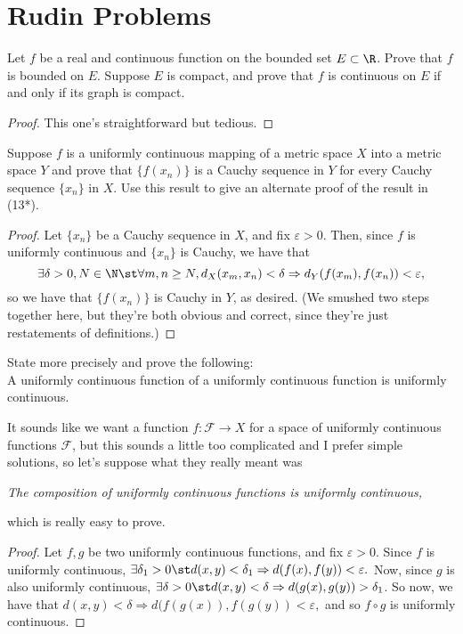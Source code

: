 \documentclass{assignment}
\begin{document}
\maketitle
\section*{Rudin Problems}
\begin{question}[4.8]
   Let $f$ be a real and continuous function on the bounded set $E \subset \R$. Prove that $f$ is 
bounded on $E$. Suppose $E$ is compact, and prove that $f$ is continuous on $E$ if and only if its 
graph is compact. 
\end{question}
\begin{proof}
 This one's straightforward but tedious.
\end{proof}

\begin{question}[4.11*]
 Suppose $f$ is a uniformly continuous mapping of a metric space $X$ into a metric space $Y$ and prove 
that $\{f(x_n)\}$ is a Cauchy sequence in $Y$ for every Cauchy sequence $\{x_n\}$ in $X$. Use this
result to give an alternate proof of the result in (13*).
\end{question}
\begin{proof}
Let $\{x_n\}$ be a Cauchy sequence in $X$, and fix $\varepsilon > 0$. Then, since $f$ is uniformly
continuous and $\{x_n\}$ is Cauchy, we have that $$\exists \delta > 0, N\in\N \st \forall m,n \geq N, 
d_X(x_m, x_n) < \delta \Rightarrow d_Y(f(x_m), f(x_n)) < \varepsilon,$$ so we have that $\{f(x_n)\}$
is Cauchy in $Y$, as desired. (We smushed two steps together here, but they're both obvious and
correct, since they're just restatements of definitions.)
\end{proof}

\begin{question}[4.12*]
 State more precisely and prove the following: \\
A uniformly continuous function of a uniformly continuous function is uniformly continuous. 
\end{question}
 It sounds like we want a function $f: \mathcal{F} \to X$ for a space of uniformly continuous
functions $\mathcal{F}$, but this sounds a little too complicated and I prefer simple solutions, so
let's suppose what they really meant was
\begin{center}
\textit{The composition of uniformly continuous functions is uniformly continuous,} \\
\end{center}
which is really easy to prove.
\begin{proof}
Let $f,g$ be two uniformly continuous functions, and fix $\varepsilon > 0$. Since $f$ is uniformly
continuous, $\exists \delta_1 > 0 \st d(x,y) < \delta_1 \Rightarrow d(f(x), f(y)) < \varepsilon.$
Now, since $g$ is also uniformly continuous, $\exists \delta > 0 \st d(x,y) < \delta \Rightarrow
d(g(x), g(y)) > \delta_1$. So now, we have that $d(x,y) < \delta \Rightarrow d(f(g(x)), f(g(y)) <
\varepsilon,$ and so $f\circ g$ is uniformly continuous.
\end{proof}
\end{document}
